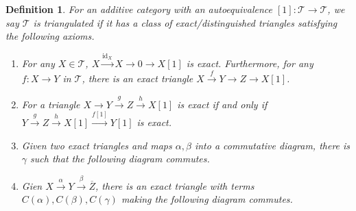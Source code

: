 \documentclass[10pt]{article}
\numberwithin{equation}{section}
\newtheorem{definition}{Definition}[section]
\DeclareMathOperator{\id}{id}
\newcommand{\sT}[0]{\mathscr{T}}
\begin{document}
\begin{definition}
    For an additive category with an autoequivalence $[1]:\sT\to\sT$, we say $\sT$ is triangulated if it has a class of exact/distinguished triangles satisfying the following axioms.
    \begin{enumerate}[TR1.]
        \item For any $X\in\sT$, $X\stackrel{\id_X}{\to}X\to 0\to X[1]$ is exact. Furthermore, for any $f:X\to Y$ in $\sT$, there is an exact triangle $X\stackrel{f}{\to}Y\to Z\to X[1]$.
        \item For a triangle $X\to Y\stackrel{g}{\to}Z\stackrel{h}{\to}X[1]$ is exact if and only if $Y\stackrel{g}{\to}Z\stackrel{h}{\to}X[1]\stackrel{f[1]}{\to}Y[1]$ is exact.
        \item Given two exact triangles and maps $\alpha,\beta$ into a commutative diagram, there is $\gamma$ such that the following diagram commutes.
        \begin{center}
        \end{center}
        \item Gien $X\stackrel{\alpha}{\to}Y\stackrel{\beta}{\to}\overline{Z}$, there is an exact triangle with terms $C(\alpha),C(\beta),C(\gamma)$ making the following diagram commutes.
        \begin{center}
        \end{center}
    \end{enumerate}
\end{definition}
\end{document}
